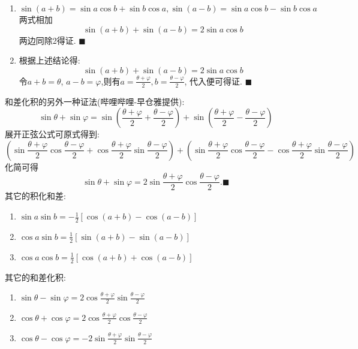 \documentclass{book}
\begin{document}
    \begin{enumerate}
        \item $$\sin (a+b)=\sin a\cos b+\sin b \cos a, \sin (a-b)=\sin a\cos b-\sin b \cos a$$\textcolor[rgb]{0.75,0.17,0.22}{两式相加}$$\sin(a+b)+\sin(a-b)=2\sin a\cos b$$两边同除2得证. $\blacksquare$
        \item 根据上述结论得:$$\sin(a+b) +\sin(a-b)=2\sin a\cos b$$\textcolor[rgb]{0.75,0.17,0.22}{令$a+b=\theta$, $a-b=\varphi$,则有$\displaystyle a=\frac{\theta+\varphi}{2},b=\frac{\theta-\varphi}{2}$}, 代入便可得证. $\blacksquare$
    \end{enumerate}

    和差化积的另外一种证法(哔哩哔哩-早仓雅提供):
    $$
    \sin \theta + \sin \varphi =\sin \left( \frac{\theta+\varphi}{2}+ \frac{\theta -\varphi}{2} \right)+\sin \left( \frac{\theta+\varphi}{2}- \frac{\theta -\varphi}{2} \right)
    $$
    展开正弦公式可原式得到:
    $$
    \left( \sin \frac{\theta +\varphi}{2}\cos \frac{\theta -\varphi}{2}+\cos \frac{\theta +\varphi}{2}\sin \frac{\theta -\varphi}{2} \right)+\left( \sin \frac{\theta +\varphi}{2}\cos \frac{\theta -\varphi}{2}-\cos \frac{\theta +\varphi}{2}\sin \frac{\theta -\varphi}{2} \right)
    $$
    化简可得
    $$
    \sin \theta + \sin \varphi = 2\sin\frac{\theta+\varphi}{2}\cos\frac{\theta-\varphi}{2}.\blacksquare
    $$
    其它的\textcolor[rgb]{0.38,0.11,0.2}{积化和差}:
    \begin{enumerate}
        \item $\displaystyle \sin a\sin b=-\frac{1}{2}[\cos(a+b)-\cos(a-b)]$
        \item $\displaystyle \cos a\sin b=\frac{1}{2}[\sin(a+b)-\sin(a-b)]$
        \item $\displaystyle \cos a\cos b=\frac{1}{2}[\cos(a+b) +\cos(a-b)]$
    \end{enumerate}

    其它的\textcolor[rgb]{0.38,0.11,0.2}{和差化积}:

    \begin{enumerate}
        \item $\displaystyle \sin \theta-\sin \varphi=2\cos\frac{\theta+\varphi}{2}\sin\frac{\theta-\varphi}{2}$
        \item $\displaystyle \cos \theta+\cos \varphi=2\cos \frac{\theta+\varphi}{2} \cos \frac{\theta-\varphi}{2}$
        \item $\displaystyle \cos \theta-\cos \varphi=-2\sin \frac{\theta+\varphi}{2} \sin \frac{\theta-\varphi}{2}$
    \end{enumerate}
\end{document}
